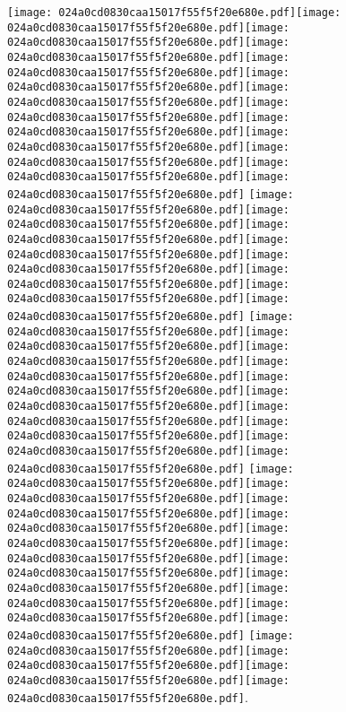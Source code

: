 \documentclass{article}
\newcommand{\origpg}[2]{\texttt{[image: 024a0cd0830caa15017f55f5f20e680e.pdf]}}
\begin{document}
{\vspace{1.861pt}\origpg3{85.303pt 279.51pt 95.52pt 295.65pt}\origpg3{95.423pt 279.51pt 103.49pt 295.65pt}\hspace{-0.597pt}\origpg3{102.9pt 279.51pt 111.11pt 295.65pt}\origpg3{111.11pt 279.51pt 118.28pt 295.65pt}\hspace{-0.21pt}\origpg3{118.07pt 279.51pt 126.12pt 295.65pt}\origpg3{126.02pt 279.51pt 134.66pt 295.65pt}\origpg3{134.66pt 279.51pt 142.73pt 295.65pt}\hspace{0.145pt}\origpg3{142.88pt 279.51pt 150.95pt 295.65pt}\hspace{-0.113pt}\origpg3{150.83pt 279.51pt 158.45pt 295.65pt}\hspace{-0.145pt}\origpg3{158.31pt 279.51pt 165.47pt 295.65pt}\origpg3{165.52pt 279.51pt 174.16pt 295.65pt}\origpg3{174.16pt 279.51pt 182.79pt 295.65pt}\origpg3{182.85pt 279.51pt 190.28pt 295.65pt} \origpg3{194.17pt 279.51pt 202.38pt 295.65pt}\origpg3{202.38pt 279.51pt 211.02pt 295.65pt}\origpg3{211.02pt 279.51pt 219.65pt 295.65pt}\hspace{-0.194pt}\origpg3{219.46pt 279.51pt 226.63pt 295.65pt}\origpg3{226.68pt 279.51pt 236.89pt 295.65pt}\origpg3{236.8pt 279.51pt 245.43pt 295.65pt}\origpg3{245.43pt 279.51pt 253.27pt 295.65pt}\origpg3{253.18pt 279.51pt 261.81pt 295.65pt} \origpg3{265.93pt 279.51pt 274.14pt 295.65pt}\hspace{-0.258pt}\origpg3{273.89pt 279.51pt 281.5pt 295.65pt}\hspace{-0.387pt}\origpg3{281.12pt 279.51pt 289.19pt 295.65pt}\hspace{-0.597pt}\origpg3{288.59pt 279.51pt 298.81pt 295.65pt}\origpg3{298.71pt 279.51pt 305.88pt 295.65pt}\hspace{-0.178pt}\origpg3{305.7pt 279.51pt 313.77pt 295.65pt}\origpg3{313.87pt 279.51pt 322.5pt 295.65pt}\origpg3{322.5pt 279.51pt 330.57pt 295.65pt}\hspace{0.145pt}\origpg3{330.72pt 279.51pt 337.33pt 295.65pt}\hspace{-0.597pt}\origpg3{336.74pt 279.51pt 344.81pt 295.65pt} \origpg3{348.78pt 279.51pt 356.85pt 295.65pt}\origpg3{356.94pt 279.51pt 364.11pt 295.65pt}\hspace{-0.178pt}\origpg3{363.93pt 279.51pt 376.36pt 295.65pt}\origpg3{376.44pt 279.51pt 383.61pt 295.65pt}\hspace{-0.178pt}\origpg3{383.43pt 279.51pt 390.48pt 295.65pt}\hspace{-0.307pt}\origpg3{390.18pt 279.51pt 398.25pt 295.65pt}\hspace{-0.597pt}\origpg3{397.65pt 279.51pt 405.77pt 295.65pt}\origpg3{405.82pt 279.51pt 414.45pt 295.65pt}\origpg3{414.45pt 279.51pt 148.5mm 295.65pt}\hspace{0.145pt}\origpg3{422.67pt 279.51pt 429.28pt 295.65pt}\hspace{-0.597pt}\origpg3{428.69pt 279.51pt 436.76pt 295.65pt} \origpg3{440.73pt 279.51pt 447.35pt 295.65pt}\hspace{-0.113pt}\origpg3{447.23pt 279.51pt 454.4pt 295.65pt}\origpg3{454.45pt 279.51pt 460.82pt 295.65pt}\hspace{-0.113pt}\origpg3{460.71pt 279.51pt 467.88pt 295.65pt}. 

}
\end{document}
